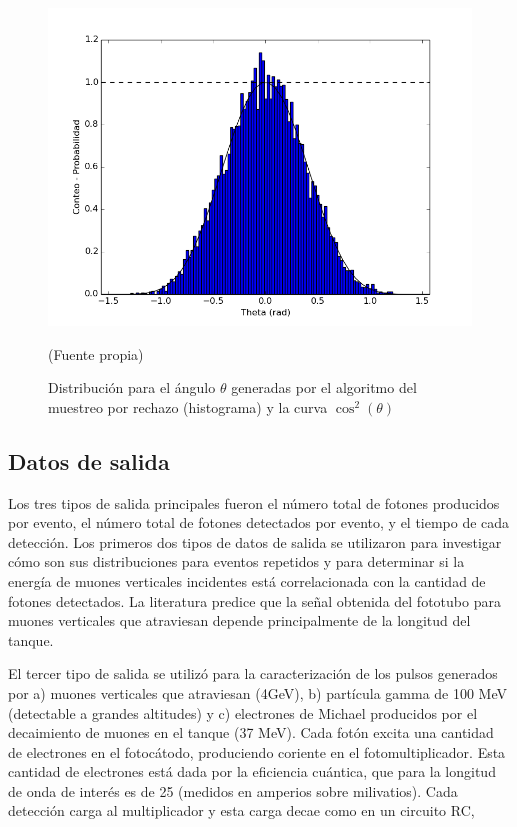\documentclass{book}
\begin{document}
\begin{figure}[h] %
\begin{center}
 \includegraphics[width=0.8\linewidth]{ThetaDist.png}

(Fuente propia)
\caption{Distribuci\'on para el \'angulo $\theta$ generadas por el algoritmo del muestreo por rechazo (histograma) y la curva $\cos^2(\theta)$}
\end{center}
\end{figure}

\subsection{Datos de salida}

Los tres tipos de salida principales fueron el n\'umero total de fotones producidos por evento, el n\'umero total de fotones detectados por evento, y el tiempo de cada detecci\'on. Los primeros dos tipos de datos de salida se utilizaron para investigar c\'omo son sus distribuciones para eventos repetidos y para determinar si la energ\'ia de muones verticales incidentes est\'a correlacionada con la cantidad de fotones detectados. La literatura predice que la se\~nal obtenida del fototubo para muones verticales que atraviesan depende principalmente de la longitud del tanque.

El tercer tipo de salida se utiliz\'o para la caracterizaci\'on de los pulsos generados por a) muones verticales que atraviesan (4GeV), b) part\'icula gamma de 100 MeV (detectable a grandes altitudes) y c) electrones de Michael producidos por el decaimiento de muones en el tanque (37 MeV). Cada fot\'on excita una cantidad de electrones en el fotoc\'atodo, produciendo coriente en el fotomultiplicador. Esta cantidad de electrones est\'a dada por la eficiencia cu\'antica, que para la longitud de onda de inter\'es es de 25 (medidos en amperios sobre milivatios). Cada detecci\'on carga al multiplicador y esta carga decae como en un circuito RC,
\end{document}
